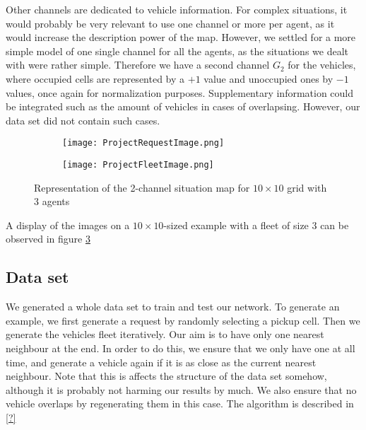 \documentclass{article}
\begin{document}
Other channels are dedicated to vehicle information.
For complex situations, it would probably be very relevant to use one channel or more per agent, as it would increase the description power of the map.
However, we settled for a more simple model of one single channel for all the agents, as the situations we dealt with were rather simple.
Therefore we have a second channel $G_2$ for the vehicles, where occupied cells are represented by a $+1$ value and unoccupied ones by $-1$ values, once again for normalization purposes.
Supplementary information could be integrated such as the amount of vehicles in cases of overlapsing.
However, our data set did not contain such cases.

\begin{figure}
\centering
    \begin{subfigure}{.45\textwidth}
        \centering
        \texttt{[image: ProjectRequestImage.png]}
        \label{fig:reqMap}
    \end{subfigure}
    
    \begin{subfigure}{.45\textwidth}
        \centering
        \texttt{[image: ProjectFleetImage.png]}
        \label{fig:vehMap}
    \end{subfigure}
\caption{Representation of the 2-channel situation map for $10 \times 10$ grid with $3$ agents} 
\label{fig:exampleMap}
\end{figure}

A display of the images on a $10\times10$-sized example with a fleet of size $3$ can be observed in figure \ref{fig:exampleMap}


\subsection{Data set}

We generated a whole data set to train and test our network.
To generate an example, we first generate a request by randomly selecting a pickup cell.
Then we generate the vehicles fleet iteratively.
Our aim is to have only one nearest neighbour at the end.
In order to do this, we ensure that we only have one at all time, and generate a vehicle again if it is as close as the current nearest neighbour.
Note that this is affects the structure of the data set somehow, although it is probably not harming our results by much.
We also ensure that no vehicle overlaps by regenerating them in this case.
The algorithm is described in \ref{?} %
\end{document}
